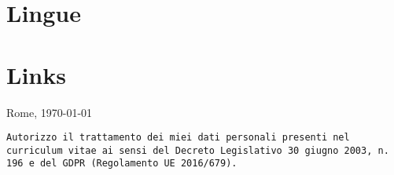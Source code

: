 \documentclass[10pt,a4paper,sans]{moderncv}
\begin{document}
\section{Lingue}

\section{Links}

\begin{scriptsize}
\vspace{\fill} 
Rome, \today
\end{scriptsize}

\begin{footnotesize}
\begin{Verbatim}
Autorizzo il trattamento dei miei dati personali presenti nel curriculum vitae ai sensi del Decreto Legislativo 30 giugno 2003, n. 196 e del GDPR (Regolamento UE 2016/679).
\end{Verbatim}
\end{footnotesize}
\end{document}
